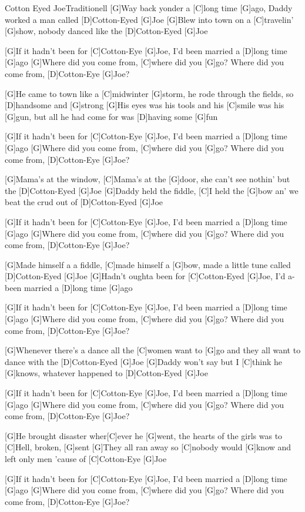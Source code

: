 \documentclass[../main.tex]{subfiles}
\begin{document}
\begin{song}{Cotton Eyed Joe}{Traditionell}{}
[G]Way back yonder a  [C]long time [G]ago, Daddy worked a man called  [D]Cotton-Eyed  [G]Joe
[G]Blew into town on a  [C]travelin' [G]show, nobody danced like the  [D]Cotton-Eyed  [G]Joe

[G]If it hadn't been for [C]Cotton-Eye [G]Joe, I'd been married a [D]long time [G]ago
[G]Where did you come from, [C]where did you [G]go? Where did you come from, [D]Cotton-Eye [G]Joe?

[G]He came to town like a [C]midwinter [G]storm, he rode through the fields, so [D]handsome and [G]strong
[G]His eyes was his tools and his [C]smile was his [G]gun, but all he had come for was [D]having some [G]fun

[G]If it hadn't been for [C]Cotton-Eye [G]Joe, I'd been married a [D]long time [G]ago
[G]Where did you come from, [C]where did you [G]go? Where did you come from, [D]Cotton-Eye [G]Joe?

[G]Mama's at the window, [C]Mama's at the [G]door, she can't see nothin' but the [D]Cotton-Eyed [G]Joe
[G]Daddy held the fiddle, [C]I held the [G]bow an' we beat the crud out of [D]Cotton-Eyed [G]Joe

[G]If it hadn't been for [C]Cotton-Eye [G]Joe, I'd been married a [D]long time [G]ago
[G]Where did you come from, [C]where did you [G]go? Where did you come from, [D]Cotton-Eye [G]Joe?

[G]Made himself a a fiddle, [C]made himself a [G]bow, made a little tune called [D]Cotton-Eyed [G]Joe
[G]Hadn't oughta been for [C]Cotton-Eyed [G]Joe, I'd a-been married a [D]long time [G]ago

[G]If it hadn't been for [C]Cotton-Eye [G]Joe, I'd been married a [D]long time [G]ago
[G]Where did you come from, [C]where did you [G]go? Where did you come from, [D]Cotton-Eye [G]Joe?

[G]Whenever there's a dance all the [C]women want to [G]go and they all want to dance with the [D]Cotton-Eyed [G]Joe
[G]Daddy won't say but I [C]think he [G]knows, whatever happened to [D]Cotton-Eyed [G]Joe

[G]If it hadn't been for [C]Cotton-Eye [G]Joe, I'd been married a [D]long time [G]ago
[G]Where did you come from, [C]where did you [G]go? Where did you come from, [D]Cotton-Eye [G]Joe?

[G]He brought disaster wher[C]ever he [G]went, the hearts of the girls was to [C]Hell, broken, [G]sent
[G]They all ran away so [C]nobody would [G]know and left only men 'cause of [C]Cotton-Eye [G]Joe

[G]If it hadn't been for [C]Cotton-Eye [G]Joe, I'd been married a [D]long time [G]ago
[G]Where did you come from, [C]where did you [G]go? Where did you come from, [D]Cotton-Eye [G]Joe?

\end{song}
\end{document}
